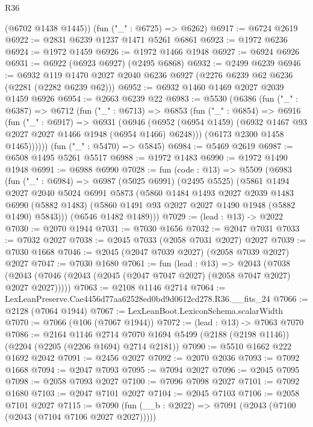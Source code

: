 \begin{lexlean}{R36}
\begin{coremodule}
      (@6702 @1438 @1445))
    (fun ("_" : @6725) => @6262)
@6917 := @6724 @2619
@6922 := @2831 @6239 @1237 @1471 @5261 @6861
@6923 := @1972 @6236
@6924 := @1972 @1459
@6926 := @1972 @1466 @1948
@6927 := @6924 @6926
@6931 := @6922 (@6923 @6927) (@2495 @6868)
@6932 := @2499 @6239
@6946 := @6932 @119 @1470 @2027 @2040 @6236 @6927 (@2276 @6239 @62 @6236 (@2281 (@2282 @6239 @62)))
@6952 := @6932 @1460 @1469 @2027 @2039 @1459 @6926
@6954 := @2663 @6239 @22
@6983 := @5530
    (@6386
      (fun ("_" : @6387) =>
      @6712
        (fun ("_" : @6713) =>
        @6853
          (fun ("_" : @6854) =>
          @6916
            (fun ("_" : @6917) =>
            @6931
              (@6946
                (@6952 (@6954 @1459) (@6932 @1467 @93 @2027 @2027 @1466 @1948 (@6954 @1466) @6248)))
              (@6173 @2300 @1458 @1465))))))
    (fun ("_" : @5470) => @5845)
@6984 := @5469 @2619
@6987 := @6508 @1495 @5261 @5517
@6988 := @1972 @1483
@6990 := @1972 @1490 @1948
@6991 := @6988 @6990
@7028 := fun (code : @13) =>
  @5509
    (@6983
      (fun ("_" : @6984) =>
      @6987
        (@5025 @6991)
        (@2495 @5525)
        (@5861
          @1494
          @2027
          @2040
          @5024
          @6991
          @5873
          (@5860
            @1484
            @1493
            @2027
            @2039
            @1483
            @6990
            (@5882 @1483)
            (@5860 @1491 @93 @2027 @2027 @1490 @1948 (@5882 @1490) @5843)))
        (@6546 @1482 @1489)))
@7029 := (lead : @13) -> @2022
@7030 := @2070 @1944
@7031 := @7030 @1656
@7032 := @2047 @7031
@7033 := @7032 @2027
@7038 := @2045 @7033 (@2058 @7031 @2027) @2027
@7039 := @7030 @1668
@7046 := @2045 (@2047 @7039 @2027) (@2058 @7039 @2027) @2027
@7047 := @7030 @1680
@7061 := fun (lead : @13) =>
  @2043 (@7038 (@2043 (@7046 (@2043 (@2045 (@2047 @7047 @2027) (@2058 @7047 @2027) @2027 @2027)))))
@7063 := @2108 @1146 @2714
@7064 := LexLeanPreserve.Cae4456d77aa62528ed0bd9d0612cd278.R36.__fits_24
@7066 := @2128 (@7064 @1944)
@7067 := LexLeanBoot.LexiconSchema.scalarWidth
@7070 := @7066 (@106 (@7067 @1944))
@7072 := (lead : @13) -> @7063 @7070
@7086 := @2164
    @1146
    @2714
    @7070
    @1694
    @5499
    (@2188 (@2198 @1146))
    (@2204 (@2205 (@2206 @1694) @2714 @2181))
@7090 := @5510 @1662 @222 @1692 @2042
@7091 := @2456 @2027
@7092 := @2070 @2036
@7093 := @7092 @1668
@7094 := @2047 @7093
@7095 := @7094 @2027
@7096 := @2045 @7095
@7098 := @2058 @7093 @2027
@7100 := @7096 @7098 @2027
@7101 := @7092 @1680
@7103 := @2047 @7101 @2027
@7104 := @2045 @7103
@7106 := @2058 @7101 @2027
@7115 := @7090 (fun (__b : @2022) => @7091 (@2043 (@7100 (@2043 (@7104 @7106 @2027 @2027)))))

\end{coremodule}
\end{lexlean}
